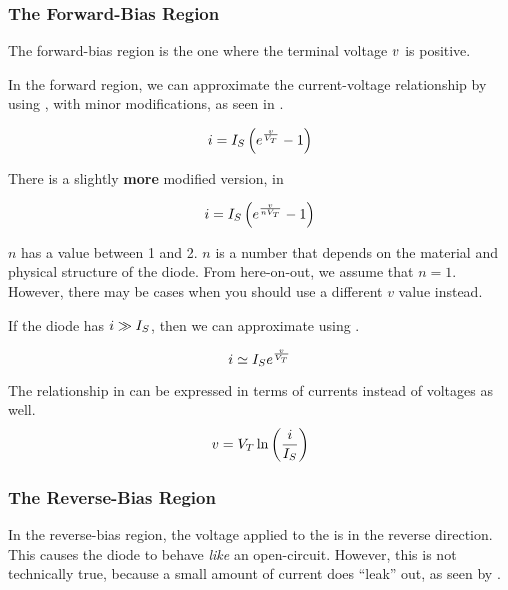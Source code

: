 \subsubsection{The Forward-Bias Region}\label{subsubsec:Diode_Forward-Bias_Region}
The forward-bias region is the one where the terminal voltage $v$ is positive.

In the forward region, we can approximate the current-voltage relationship by using , with minor modifications, as seen in .

\begin{equation}\label{eq:Diode_Forward-Bias-IV_Relationship}
  i = I_{S} \left( e^{\frac{v}{V_{T}}} - 1 \right)
\end{equation}

There is a slightly \textbf{more} modified version, in 

\begin{equation}\label{eq:Diode_Forward-Bias-IV_Relationship-n}
  i = I_{S} \left( e^{\frac{v}{n V_{T}}} - 1 \right)
\end{equation}

$n$ has a value between 1 and 2.
$n$ is a number that depends on the material and physical structure of the diode.
From here-on-out, we assume that $n = 1$.
However, there may be cases when you should use a different $v$ value instead.

If the diode has $i \gg I_{S}$, then we can approximate  using .

\begin{equation}\label{eq:Diode_Forward-Bias-IV_Relationship-Approximate}
  i \simeq I_{S} e^{\frac{v}{V_{T}}}
\end{equation}

The relationship in  can be expressed in terms of currents instead of voltages as well.
\begin{equation}\label{eq:Diode_Forward-Bias-VI_Relationship-Approximate}
  v = V_{T} \ln \left( \frac{i}{I_{S}} \right)
\end{equation}

\subsubsection{The Reverse-Bias Region}\label{subsubsec:Diode_Reverse-Bias_Region}
In the reverse-bias region, the voltage applied to the  is in the reverse direction.
This causes the diode to behave \emph{like} an open-circuit.
However, this is not technically true, because a small amount of current does ``leak'' out, as seen by .

